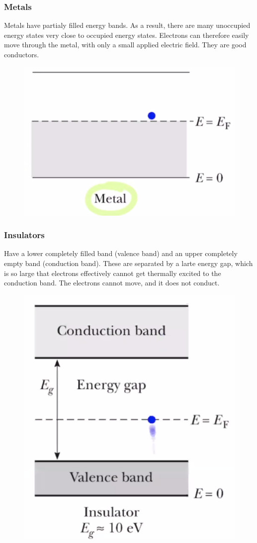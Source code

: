\documentclass[class=article,crop=false]{standalone}
\begin{document}
\subsubsection{Metals}
Metals have partialy filled energy bands. As a result, there are many unoccupied energy states very close to occupied energy states. Electrons can therefore easily move through the metal, with only a small applied electric field. They are good conductors.

\begin{figure}[h!]
	\centering
	\includegraphics[width=.8\linewidth]{./Images/metal_band.png}
	\caption{}
\end{figure}

\subsubsection{Insulators}
Have a lower completely filled band (valence band) and an upper completely empty band (conduction band). These are separated by a larte energy gap, which is so large that electrons effectively cannot get thermally excited to the conduction band. The electrons cannot move, and it does not conduct. 

\begin{figure}[h!]
	\centering
	\includegraphics[width=.8\linewidth]{./Images/insulator_band.png}
	\caption{}
\end{figure}
\end{document}
